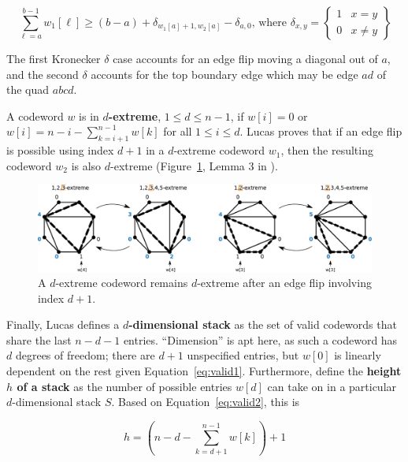 \documentclass[english]{socg-lipics-v2021}
\begin{document}
\begin{equation}
    \label{eq:rot3}
    \sum_{\ell = a}^{b-1} w_1[\ell] \geq (b - a) + \delta_{w_1[a]+1, w_2[a]} - \delta_{a,0} \text{,  where }  \delta_{x,y} = \left\{ \begin{array}{cc} 1 & x = y \\ 0 & x \neq y \end{array} \right\}
\end{equation}

The first Kronecker $\delta$ case accounts for an edge flip moving a diagonal out of $a$, and the second $\delta$ accounts for the top boundary edge which may be edge $ad$ of the quad $abcd$.



A codeword $w$ is in {\bf $d$-extreme}, $1 \leq d \leq n-1$, if $w[i] = 0$ or $w[i] = n-i-\sum_{k=i+1}^{n-1} w[k]$ for all $1 \leq i \leq d$.  Lucas proves that if an edge flip is possible using index $d+1$ in a $d$-extreme codeword $w_1$, then the resulting codeword $w_2$ is also $d$-extreme (Figure~\ref{fig:extreme}, Lemma 3 in \cite{lucas1987rotation}).

\begin{figure}
    \centering
    \includegraphics[width=\textwidth]{Extreme.pdf}
    \caption{A $d$-extreme codeword remains $d$-extreme after an edge flip involving index $d+1$.}
    \label{fig:extreme}
\end{figure}


Finally, Lucas defines a {\bf $d$-dimensional stack} as the set of valid codewords that share the last $n-d-1$ entries.  ``Dimension'' is apt here, as such a codeword has $d$ degrees of freedom; there are $d+1$ unspecified entries, but $w[0]$ is linearly dependent on the rest given Equation~\ref{eq:valid1}.  Furthermore, define the {\bf height $h$ of a stack} as the number of possible entries $w[d]$ can take on in a particular $d$-dimensional stack $S$.  Based on Equation~\ref{eq:valid2}, this is

\begin{equation}
    h = \left(n-d-\sum_{k=d+1}^{n-1} w[k]\right) + 1
\end{equation}
\end{document}
